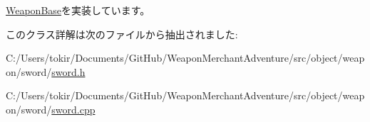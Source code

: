 \mbox{\hyperlink{class_weapon_base_a389110ad7653d16eecfd9770a8b6b08e}{Weapon\+Base}}を実装しています。



このクラス詳解は次のファイルから抽出されました\+:\begin{DoxyCompactItemize}
\item 
C\+:/\+Users/tokir/\+Documents/\+Git\+Hub/\+Weapon\+Merchant\+Adventure/src/object/weapon/sword/\mbox{\hyperlink{sword_8h}{sword.\+h}}\item 
C\+:/\+Users/tokir/\+Documents/\+Git\+Hub/\+Weapon\+Merchant\+Adventure/src/object/weapon/sword/\mbox{\hyperlink{sword_8cpp}{sword.\+cpp}}\end{DoxyCompactItemize}
